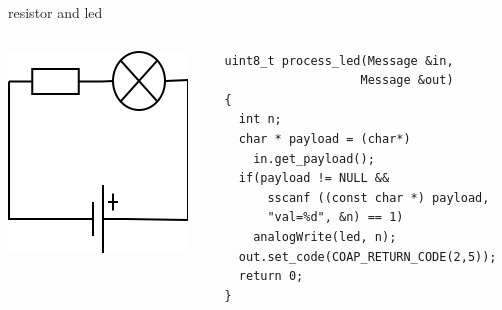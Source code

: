 \begin{frame}[containsverbatim]{resistor and led}
	\begin{columns}[c,onlytextwidth]
		\begin{column}[c]{.5\textwidth}
			\begin{center}
				\includegraphics [width=.9\textwidth,keepaspectratio]{img/resistor_led.png}
			\end{center}
		\end{column}
		\begin{column}[c]{.5\textwidth}
\begin{Verbatim}[fontsize=\scriptsize]
uint8_t process_led(Message &in, 
	               Message &out) 
{
  int n;
  char * payload = (char*) 
    in.get_payload();
  if(payload != NULL && 
      sscanf ((const char *) payload, 
	  "val=%d", &n) == 1)
  	analogWrite(led, n);
  out.set_code(COAP_RETURN_CODE(2,5));
  return 0;
}
\end{Verbatim}
		\end{column}
	\end{columns}
\end{frame}


